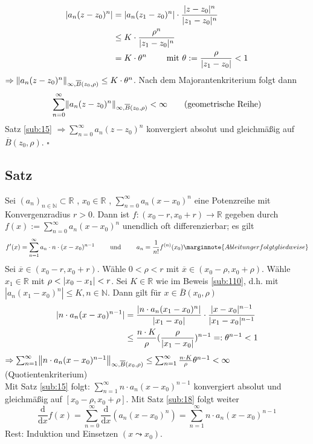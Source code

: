 \begin{align*}
	\lvert a_n (z-z_0)^n\rvert &= \lvert a_n (z_1 -z_0)^n\rvert \cdot \frac{\lvert z-z_0\rvert^n }{\lvert z_1-z_0\rvert^n }  \\
	&\le K \cdot \frac{\rho^n}{\lvert z_1- z_0\rvert^n } \\
	&= K \cdot \theta^n \qquad \text{ mit } \theta := \frac{\rho}{\lvert z_1 -z_0\rvert } < 1 
\end{align*}
$\Rightarrow \norm[\infty, \overline{B}(z_0, \rho) ]{a_n (z-z_0)^n}  \le K \cdot \theta^n$. Nach dem Majorantenkriterium folgt dann
\[
	\sum_{n=0}^{\infty} \norm[\infty, \overline{B} (z_0, \rho)]{a_n (z-z_0)^n} < \infty \tag{geometrische Reihe}
\]
Satz \ref{sub:15} $\Rightarrow \sum_{n=0}^{\infty} a_n (z-z_0)^n$ konvergiert absolut und gleichmäßig auf $\overline{B}(z_0, \rho) $. \hfill \( \square \)

\subsection[Satz über Differenzierbarkeit innerhalb des Konvergenzradius]{Satz} %
\label{sub:111}
Sei $(a_n)_{n \in \mathds{N}} \subset \mathds{R}$ , $x_0 \in \mathds{R}$ , $\sum_{n=0}^{\infty} a_n (x-x_0)^n$ eine Potenzreihe mit Konvergenzradius $r>0$.
Dann ist $f : (x_0 -r , x_0 +r) \to \mathds{R}$ gegeben durch $f(x) := \sum_{n=0}^{\infty} a_n (x-x_0)^n$ unendlich oft differenzierbar; es gilt
\[
	f'(x) = \sum_{n=1}^{\infty} a_n \cdot n \cdot (x-x_0)^{n-1} \qquad \text{ und } \qquad a_n = \frac{1}{n!} f^{(n)}(x_0)
	\marginnote{Ableitung erfolgt gliedweise}
\]
Sei $\overline{x}\in (x_0 -r, x_0 +r) $. Wähle $0<\rho < r$ mit $\overline{x} \in ( x_0 - \rho, x_0 + \rho)$. Wähle $x_1\in \mathds{R}$ mit $\rho < \lvert x_0 - x_1\rvert <r $.
Sei $K \in \mathds{R}$ wie im Beweis \ref{sub:110}, d.h. mit $| a_n(x_1 -x_0)^n | \le K , n \in \mathds{N} $. Dann gilt für $x \in \overline{B}(x_0, \rho) $
\begin{align*}
	\lvert n \cdot a_n (x-x_0)^{n-1}\rvert &= \frac{\lvert n \cdot  a_n (x_1-x_0)^n\rvert}{\lvert x_1-x_0\rvert } \cdot \frac{\lvert x-x_0\rvert^{n-1} }{\lvert x_1-x_0\rvert^{n-1} } \\  
	&\le \frac{n \cdot K}{\rho} (\frac{\rho}{\lvert x_1-x_0\rvert } )^{n-1} =: \theta^{n-1} <1  
\end{align*}
$\Rightarrow \sum_{n=1}^{\infty} \norm[\infty, \overline{B} (x_0, \rho)]{n \cdot a_n (x-x_0)^{n-1}}\le \sum_{n=1}^{\infty} \frac{n \cdot K}{\rho} \theta^{n-1} <\infty $
 (Quotientenkriterium)\\
Mit Satz \ref{sub:15} folgt: $\sum_{n=1}^{\infty} n \cdot a_n (x-x_0)^{n-1} $ konvergiert absolut und gleichmäßig auf $[x_0- \rho, x_0+\rho]$. Mit Satz \ref{sub:18} folgt 
weiter
\[
	\frac{\mathrm{d}}{ \mathrm{d}x } f(x) = \sum_{n=0}^{\infty}  \frac{\mathrm{d}}{ \mathrm{d}x } (a_n (x-x_0)^n) = \sum_{n=1}^{\infty} n \cdot a_n (x-x_0)^{n-1}
\]
Rest: Induktion und Einsetzen $(x \leadsto x_0)$. \bewende

